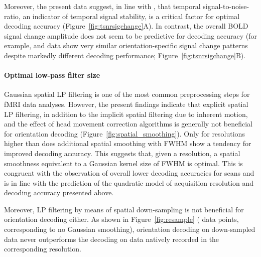 Moreover, the present data suggest, in line with \citet{chaimow_2011}, that
temporal signal-to-noise-ratio, an indicator of temporal signal stability, is a
critical factor for optimal decoding accuracy
(Figure~\ref{fig:tsnrsigchange}A). In contrast, the overall BOLD signal change
amplitude does not seem to be predictive for decoding accuracy (for example,
 and  data show very similar orientation-specific signal change
patterns despite markedly different decoding performance;
Figure~\ref{fig:tsnrsigchange}B).


\paragraph*{Optimal low-pass filter size}
%
Gaussian spatial LP filtering is one of the most common preprocessing steps for
fMRI data analyses. However, the present findings indicate that explicit
spatial LP filtering, in addition to the implicit spatial filtering due to
inherent motion, and the effect of head movement correction algorithms is
generally not beneficial for orientation decoding
(Figure~\ref{fig:spatial_smoothing}). Only for resolutions higher than 
does additional spatial smoothing with  FWHM show a tendency for improved
decoding accuracy. This suggests that, given a resolution, a spatial
smoothness equivalent to a Gaussian kernel size of  FWHM is
optimal. This is congruent with the observation of overall lower decoding
accuracies for  scans and is in line with the prediction of the quadratic
model of acquisition resolution and decoding accuracy presented above.

Moreover, LP filtering by means of spatial down-sampling is not beneficial for
orientation decoding either. As shown in Figure~\ref{fig:resample} ( data
points, corresponding to no Gaussian smoothing), orientation decoding on
down-sampled data never outperforms the decoding on data natively recorded in
the corresponding resolution.


